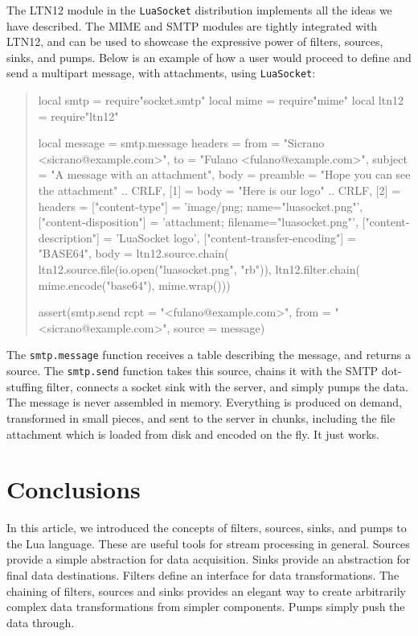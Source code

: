 \documentclass[10pt]{article}
\begin{document}
The LTN12 module in the \texttt{LuaSocket} distribution
implements all the ideas we have described. The MIME
and SMTP modules are tightly integrated with LTN12,
and can be used to showcase the expressive power of filters,
sources, sinks, and pumps. Below is an example
of how a user would proceed to define and send a
multipart message, with attachments, using \texttt{LuaSocket}:
\begin{quote}
\begin{mime}
local smtp = require"socket.smtp"
local mime = require"mime"
local ltn12 = require"ltn12"

local message = smtp.message{
  headers = {
    from = "Sicrano <sicrano@example.com>",
    to = "Fulano <fulano@example.com>",
    subject = "A message with an attachment"},
  body = {
    preamble = "Hope you can see the attachment" .. CRLF,
    [1] = {
      body = "Here is our logo" .. CRLF},
    [2] = {
      headers = {
        ["content-type"] = 'image/png; name="luasocket.png"',
        ["content-disposition"] =
          'attachment; filename="luasocket.png"',
        ["content-description"] = 'LuaSocket logo',
        ["content-transfer-encoding"] = "BASE64"},
      body = ltn12.source.chain(
        ltn12.source.file(io.open("luasocket.png", "rb")),
        ltn12.filter.chain(
          mime.encode("base64"),
          mime.wrap()))}}}

assert(smtp.send{
  rcpt = "<fulano@example.com>",
  from = "<sicrano@example.com>",
  source = message})
\end{mime}
\end{quote}

The \texttt{smtp.message} function receives a table
describing the message, and returns a source. The
\texttt{smtp.send} function takes this source, chains it with the
SMTP dot-stuffing filter, connects a socket sink
with the server, and simply pumps the data. The message is never
assembled in memory.  Everything is produced on demand,
transformed in small pieces, and sent to the server in chunks,
including the file attachment which is loaded from disk and
encoded on the fly. It just works.

\section{Conclusions}

In this article, we introduced the concepts of filters,
sources, sinks, and pumps to the Lua language. These are
useful tools for stream processing in general. Sources provide
a simple abstraction for data acquisition. Sinks provide an
abstraction for final data destinations. Filters define an
interface for data transformations.  The chaining of
filters, sources and sinks provides an elegant way to create
arbitrarily complex data transformations from simpler
components. Pumps simply push the data through.
\end{document}
